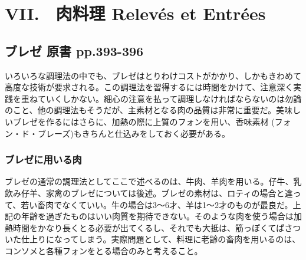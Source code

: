 \href{✓原稿下準備なし}{} \href{訳と注釈\%2020180424古い原稿のコピペ}{}
\href{未、原文対照チェック}{} \href{未、日本語表現校正}{}
\href{未、注釈チェク}{} \href{未、原稿最終校正}{}

\hypertarget{vii.ux8089ux6599ux7406-relevuxe9s-et-entruxe9es}{%
\chapter{VII.　肉料理 Relevés et
Entrées}\label{vii.ux8089ux6599ux7406-relevuxe9s-et-entruxe9es}}

\begin{center}
\end{center}
\normalsize
\vspace{1\zw}
\normalsize

\hypertarget{ux30d6ux30ecux30bc-ux539fux66f8-pp.393-396}{%
\section{ブレゼ 原書
pp.393-396}\label{ux30d6ux30ecux30bc-ux539fux66f8-pp.393-396}}

いろいろな調理法の中でも、ブレゼはとりわけコストがかかり、しかもきわめて高度な技術が要求される。この調理法を習得するには時間をかけて、注意深く実践を重ねていくしかない。細心の注意を払って調理しなければならないのは勿論のこと、他の調理法もそうだが、主素材となる肉の品質は非常に重要だ。美味しいブレゼを作るにはさらに、加熱の際に上質のフォンを用い、香味素材
(フォン・ド・ブレーズ)もきちんと仕込みをしておく必要がある。

\hypertarget{ux30d6ux30ecux30bcux306bux7528ux3044ux308bux8089}{%
\subsection{ブレゼに用いる肉}\label{ux30d6ux30ecux30bcux306bux7528ux3044ux308bux8089}}

ブレゼの通常の調理法としてここで述べるのは、牛肉、羊肉を用いる。仔牛、乳飲み仔羊、家禽のブレゼについては後述。ブレゼの素材は、ロティの場合と違って、若い畜肉でなくていい。牛の場合は3〜6才、羊は1〜2才のものが最良だ。上記の年齢を過ぎたものはいい肉質を期待できない。そのような肉を使う場合は加熱時間をかなり長くとる必要が出てくるし、それでも大抵は、筋っぽくてぱさついた仕上りになってしまう。実際問題として、料理に老齢の畜肉を用いるのは、コンソメと各種フォンをとる場合のみと考えること。

